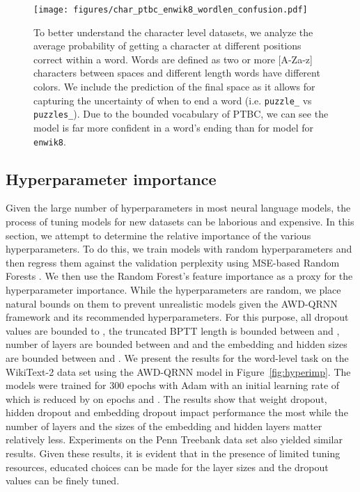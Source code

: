 \documentclass{article}
\newcommand{\enwik}{\texttt{enwik8}\xspace}
\begin{document}
\begin{figure}
\centering
\texttt{[image: figures/char\_ptbc\_enwik8\_wordlen\_confusion.pdf]}
\caption{
To better understand the character level datasets, we analyze the average probability of getting a character at different positions correct within a word.
Words are defined as two or more [A-Za-z] characters between spaces and different length words have different colors.
We include the prediction of the final space as it allows for capturing the uncertainty of when to end a word (i.e. \texttt{puzzle\_} vs \texttt{puzzles\_}).
Due to the bounded vocabulary of PTBC, we can see the model is far more confident in a word's ending than for model for \enwik.
}
\label{fig:wordlen_confusion}
\end{figure}

\subsection{Hyperparameter importance}
Given the large number of hyperparameters in most neural language models, the process of tuning models for new datasets can be laborious and expensive. In this section, we attempt to determine the relative importance of the various hyperparameters. To do this, we train  models with random hyperparameters and then regress them against the validation perplexity using MSE-based Random Forests \cite{breiman2001random}. We then use the Random Forest's feature importance as a proxy for the hyperparameter importance. While the hyperparameters are random, we place natural bounds on them to prevent unrealistic models given the AWD-QRNN framework and its recommended hyperparameters. For this purpose, all dropout values are bounded to , the truncated BPTT length is bounded between  and , number of layers are bounded between  and  and the embedding and hidden sizes are bounded between  and . We present the results for the word-level task on the WikiText-2 data set using the AWD-QRNN model in Figure~\ref{fig:hyperimp}. The models were trained for 300 epochs with Adam with an initial learning rate of  which is reduced by  on epochs  and . The results show that weight dropout, hidden dropout and embedding dropout impact performance the most while the number of layers and the sizes of the embedding and hidden layers matter relatively less. Experiments on the Penn Treebank data set also yielded similar results. Given these results, it is evident that in the presence of limited tuning resources, educated choices can be made for the layer sizes and the dropout values can be finely tuned. 
\end{document}
